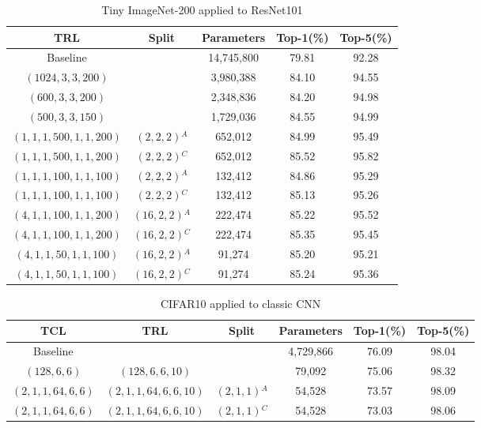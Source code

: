 \documentclass{article}
\begin{document}
	\begin{table}
	\caption{Tiny ImageNet-200 applied to ResNet101}
	\label{atab-6}
	\centering
	\begin{tabular}{c c c c c}
		\toprule
		\textbf{TRL} & \textbf{Split} & \textbf{Parameters} & \textbf{Top-1(\%)} & \textbf{Top-5(\%)} \\
		\midrule
		Baseline & & 14,745,800 & 79.81 & 92.28 \\
		$(1024,3,3,200)$ & & 3,980,388 & 84.10 & 94.55 \\
		$(600,3,3,200)$ & & 2,348,836 & 84.20 & 94.98 \\
		$(500,3,3,150)$ & & 1,729,036 & 84.55 & 94.99 \\
		$(1,1,1,500,1,1,200)$ & $(2,2,2)$$^A$ & 652,012 & 84.99 & 95.49 \\
		$(1,1,1,500,1,1,200)$ & $(2,2,2)$$^C$ & 652,012 & 85.52 & 95.82 \\
		$(1,1,1,100,1,1,100)$ & $(2,2,2)$$^A$ & 132,412 & 84.86 & 95.29 \\
		$(1,1,1,100,1,1,100)$ & $(2,2,2)$$^C$ & 132,412 & 85.13 & 95.26 \\
		$(4,1,1,100,1,1,200)$ & $(16,2,2)$$^A$ & 222,474 & 85.22 & 95.52 \\
		$(4,1,1,100,1,1,200)$ & $(16,2,2)$$^C$ & 222,474 & 85.35 & 95.45 \\
		$(4,1,1,50,1,1,100)$ & $(16,2,2)$$^A$ & 91,274 & 85.20 & 95.21 \\
		$(4,1,1,50,1,1,100)$ & $(16,2,2)$$^C$ & 91,274 & 85.24 & 95.36 \\
		\hline
	\end{tabular}
\end{table}
\begin{table}
	\caption{CIFAR10 applied to classic CNN}
	\label{atab-7}
	\centering
	\begin{tabular}{c c c c c c}
		\toprule
		\textbf{TCL} & \textbf{TRL} & \textbf{Split} & \textbf{Parameters} & \textbf{Top-1(\%)} & \textbf{Top-5(\%)} \\
		\midrule
		Baseline& & & 4,729,866 & 76.09 & 98.04 \\
		$(128,6,6)$ & $(128,6,6,10)$ & & 79,092 & 75.06 & 98.32 \\
		$(2,1,1,64,6,6)$ & $(2,1,1,64,6,6,10)$ & $(2,1,1)$$^A$ & 54,528 & 73.57 & 98.09 \\
		$(2,1,1,64,6,6)$ & $(2,1,1,64,6,6,10)$ & $(2,1,1)$$^C$ & 54,528 & 73.03 & 98.06 \\
		\hline
	\end{tabular}
\end{table}
\end{document}
